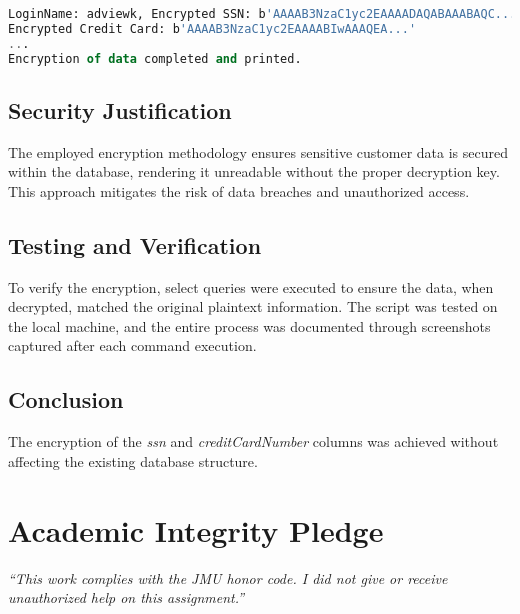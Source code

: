 \documentclass{article}
\begin{document}
\begin{lstlisting}[language=SQL]
LoginName: adviewk, Encrypted SSN: b'AAAAB3NzaC1yc2EAAAADAQABAAABAQC...', 
Encrypted Credit Card: b'AAAAB3NzaC1yc2EAAAABIwAAAQEA...'
...
Encryption of data completed and printed.
\end{lstlisting}

\subsection*{Security Justification}
The employed encryption methodology ensures sensitive customer data is secured within the database, rendering it unreadable without the proper decryption key. This approach mitigates the risk of data breaches and unauthorized access.

\subsection*{Testing and Verification}
To verify the encryption, select queries were executed to ensure the data, when decrypted, matched the original plaintext information. The script was tested on the local machine, and the entire process was documented through screenshots captured after each command execution.

\subsection*{Conclusion}
The encryption of the \textit{ssn} and \textit{creditCardNumber} columns was achieved without affecting the existing database structure. 

\vfill
  \section*{Academic Integrity Pledge}
    {\color{red}\textit{“This work complies with the JMU honor code. I did not give or receive unauthorized help on this assignment.”}}
\end{document}
